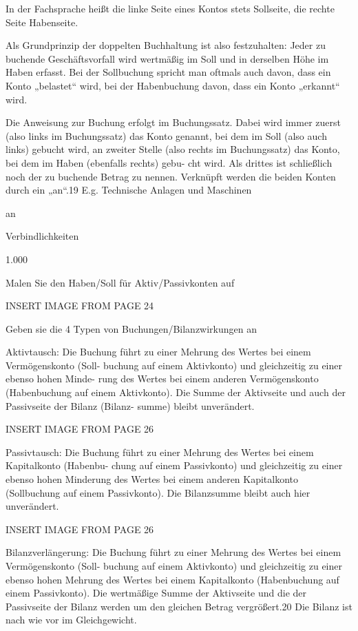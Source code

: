 In der Fachsprache heißt die linke Seite eines Kontos stets Sollseite, die
rechte Seite Habenseite.

Als Grundprinzip der doppelten Buchhaltung ist also festzuhalten: Jeder zu
buchende Geschäftsvorfall wird wertmäßig im Soll und in derselben Höhe
im Haben erfasst. Bei der Sollbuchung spricht man oftmals auch davon, dass ein
Konto „belastet“ wird, bei der Habenbuchung davon, dass ein Konto „erkannt“ wird.

Die Anweisung zur Buchung erfolgt im Buchungssatz. Dabei wird
immer zuerst (also links im Buchungssatz) das Konto genannt, bei dem
im Soll (also auch links) gebucht wird, an zweiter Stelle (also rechts im
Buchungssatz) das Konto, bei dem im Haben (ebenfalls rechts) gebu-
cht wird. Als drittes ist schließlich noch der zu buchende Betrag zu
nennen. Verknüpft werden die beiden Konten durch ein „an“.19
E.g.
Technische Anlagen
und Maschinen

an

Verbindlichkeiten

1.000



Malen Sie den Haben/Soll für Aktiv/Passivkonten auf

INSERT IMAGE FROM PAGE 24


Geben sie die 4 Typen von Buchungen/Bilanzwirkungen an

Aktivtausch:
Die Buchung führt zu einer Mehrung des Wertes bei einem Vermögenskonto (Soll-
buchung auf einem Aktivkonto) und gleichzeitig zu einer ebenso hohen Minde-
rung des Wertes bei einem anderen Vermögenskonto (Habenbuchung auf einem
Aktivkonto). Die Summe der Aktivseite und auch der Passivseite der Bilanz (Bilanz-
summe) bleibt unverändert.

INSERT IMAGE FROM PAGE 26

Passivtausch:
Die Buchung führt zu einer Mehrung des Wertes bei einem Kapitalkonto (Habenbu-
chung auf einem Passivkonto) und gleichzeitig zu einer ebenso hohen Minderung
des Wertes bei einem anderen Kapitalkonto (Sollbuchung auf einem Passivkonto).
Die Bilanzsumme bleibt auch hier unverändert.

INSERT IMAGE FROM PAGE 26 

Bilanzverlängerung:
Die Buchung führt zu einer Mehrung des Wertes bei einem Vermögenskonto (Soll-
buchung auf einem Aktivkonto) und gleichzeitig zu einer ebenso hohen Mehrung
des Wertes bei einem Kapitalkonto (Habenbuchung auf einem Passivkonto). Die
wertmäßige Summe der Aktivseite und die der Passivseite der Bilanz werden um
den gleichen Betrag vergrößert.20 Die Bilanz ist nach wie vor im Gleichgewicht.


